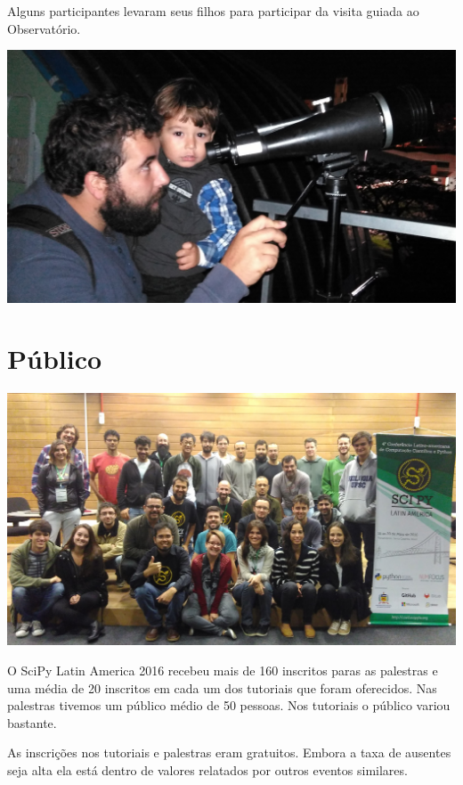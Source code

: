 \documentclass[12pt]{article}
\begin{document}
Alguns participantes levaram seus filhos para participar da visita guiada ao
Observatório.

\noindent  %
\includegraphics[width=\textwidth]{social-family.jpg}

\newpage

\section*{Público}

\noindent  %
\includegraphics[width=\textwidth]{group.jpg}

O SciPy Latin America 2016 recebeu mais de 160 inscritos paras as palestras e
uma média de 20 inscritos em cada um dos tutoriais que foram oferecidos.
Nas palestras tivemos um público médio de 50 pessoas. Nos tutoriais o público
variou bastante.

As inscrições nos tutoriais e palestras eram gratuitos. Embora a taxa de
ausentes seja alta ela está dentro de valores relatados por outros eventos
similares.
\end{document}
